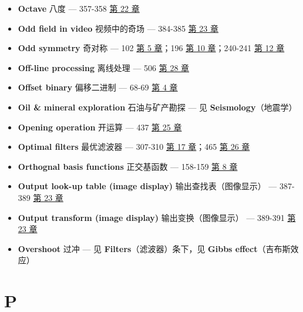 \begin{itemize}
\tightlist
\item
  \textbf{Octave} 八度 --- 357-358  \hyperref[ch-22]{第 22 章}
\item
  \textbf{Odd field in video} 视频中的奇场 --- 384-385 
  \hyperref[ch-23]{第 23 章}
\item
  \textbf{Odd symmetry} 奇对称 --- 102  \hyperref[ch-05]{第 5
  章}；196  \hyperref[ch-10]{第 10 章}；240-241 
  \hyperref[ch-12]{第 12 章}
\item
  \textbf{Off-line processing} 离线处理 --- 506 
  \hyperref[ch-28]{第 28 章}
\item
  \textbf{Offset binary} 偏移二进制 --- 68-69 
  \hyperref[ch-04]{第 4 章}
\item
  \textbf{Oil \& mineral exploration} 石油与矿产勘探 --- 见
  \textbf{Seismology}（地震学）
\item
  \textbf{Opening operation} 开运算 --- 437 
  \hyperref[ch-25]{第 25 章}
\item
  \textbf{Optimal filters} 最优滤波器 --- 307-310 
  \hyperref[ch-17]{第 17 章}；465  \hyperref[ch-26]{第 26 章}
\item
  \textbf{Orthognal basis functions} 正交基函数 --- 158-159 
  \hyperref[ch-08]{第 8 章}
\item
  \textbf{Output look-up table (image display)} 输出查找表（图像显示）
  --- 387-389  \hyperref[ch-23]{第 23 章}
\item
  \textbf{Output transform (image display)} 输出变换（图像显示） ---
  389-391  \hyperref[ch-23]{第 23 章}
\item
  \textbf{Overshoot} 过冲 --- 见 \textbf{Filters}（滤波器）条下，见
  \textbf{Gibbs effect}（吉布斯效应）
\end{itemize}

\section{P}

